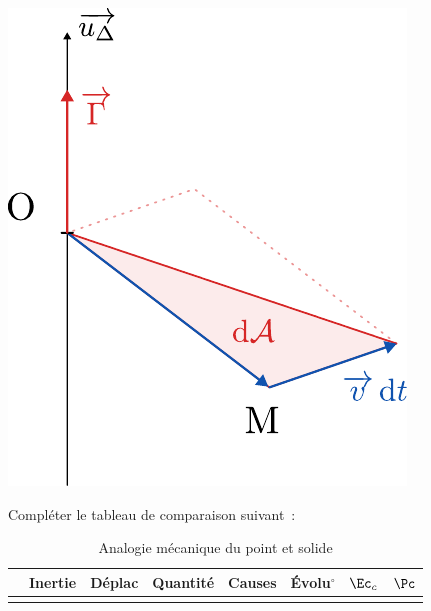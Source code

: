 \documentclass[a4paper, 10pt, final, garamond]{book}
\begin{document}
\begin{enumerate}[label=\sqenumi]
\begin{isd}
\begin{center}
{			}{
				\includegraphics[scale=.6]{dAmomcin}
			}
		\end{center}
	\end{isd}
	Compléter le tableau de comparaison suivant~:
	\begin{table}[htbp!]
		\centering
		\caption{Analogie mécanique du point et solide }
		\begin{tabularx}{\linewidth}{|l|c|c|Y|c|Y|c|c|}
			\hline
			                                                  &
			Inertie                                           &
			Déplac\mnt                                        &
			Quantité                                          &
			Causes                                            &
			Évolu$^\circ$                                     &
			$\Ec_c$                                           &
			$\Pc$
			\\\hline
			                   &
			                                         &
			\psw{$\vf$}                                       &
			                                &
			\psw{$\Ff$}                                       &
			              &
			                           &
			\psw{$\Ff \cdot \vf$}
			\\[1em]\hline

\end{tabularx}
\end{table}
\end{enumerate}
\end{document}
